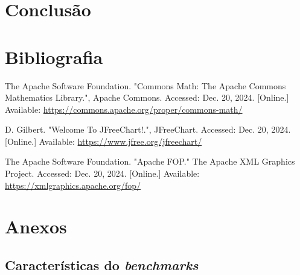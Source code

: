 \documentclass[11pt, a4paper]{article}
\begin{document}
\section{Conclusão}

\section{Bibliografia}
\def\refname{}
\vspace{-1.5cm}
\begin{thebibliography}{9}
        The Apache Software Foundation. "Commons Math: The Apache Commons Mathematics Library."{},
        Apache Commons. Accessed: Dec. 20, 2024. [Online.] Available:
        \url{https://commons.apache.org/proper/commons-math/}

        D. Gilbert. "Welcome To JFreeChart!."{}, JFreeChart. Accessed: Dec. 20, 2024. [Online.]
        Available: \url{https://www.jfree.org/jfreechart/}

        The Apache Software Foundation. "Apache FOP."{} The Apache XML Graphics Project. Accessed:
        Dec. 20, 2024. [Online.] Available: \url{https://xmlgraphics.apache.org/fop/}
\end{thebibliography}

\section{Anexos}

\subsection{Características do \emph{benchmarks}}
\label{benckmark-description}
\end{document}
